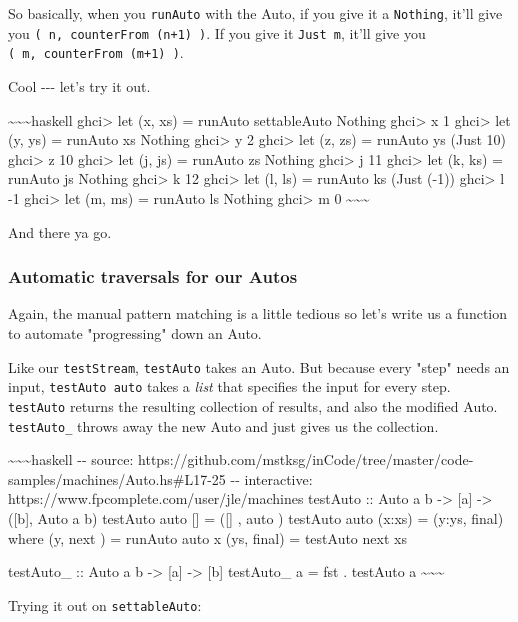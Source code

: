 \documentclass[]{article}
\begin{document}
So basically, when you \texttt{runAuto} with the Auto, if you give it a
\texttt{Nothing}, it'll give you \texttt{(\ n,\ counterFrom\ (n+1)\ )}. If you
give it \texttt{Just\ m}, it'll give you \texttt{(\ m,\ counterFrom\ (m+1)\ )}.

Cool -\/-\/- let's try it out.

\textasciitilde{}\textasciitilde{}\textasciitilde{}haskell ghci\textgreater{}
let (x, xs) = runAuto settableAuto Nothing ghci\textgreater{} x 1
ghci\textgreater{} let (y, ys) = runAuto xs Nothing ghci\textgreater{} y 2
ghci\textgreater{} let (z, zs) = runAuto ys (Just 10) ghci\textgreater{} z 10
ghci\textgreater{} let (j, js) = runAuto zs Nothing ghci\textgreater{} j 11
ghci\textgreater{} let (k, ks) = runAuto js Nothing ghci\textgreater{} k 12
ghci\textgreater{} let (l, ls) = runAuto ks (Just (-1)) ghci\textgreater{} l -1
ghci\textgreater{} let (m, ms) = runAuto ls Nothing ghci\textgreater{} m 0
\textasciitilde{}\textasciitilde{}\textasciitilde{}

And there ya go.

\subsubsection{Automatic traversals for our Autos}

Again, the manual pattern matching is a little tedious so let's write us a
function to automate "progressing" down an Auto.

Like our \texttt{testStream}, \texttt{testAuto} takes an Auto. But because every
"step" needs an input, \texttt{testAuto\ auto} takes a \emph{list} that
specifies the input for every step. \texttt{testAuto} returns the resulting
collection of results, and also the modified Auto. \texttt{testAuto\_} throws
away the new Auto and just gives us the collection.

\textasciitilde{}\textasciitilde{}\textasciitilde{}haskell -\/- source:
https://github.com/mstksg/inCode/tree/master/code-samples/machines/Auto.hs\#L17-25
-\/- interactive: https://www.fpcomplete.com/user/jle/machines testAuto :: Auto
a b -\textgreater{} {[}a{]} -\textgreater{} ({[}b{]}, Auto a b) testAuto auto
{[}{]} = ({[}{]} , auto ) testAuto auto (x:xs) = (y:ys, final) where (y, next )
= runAuto auto x (ys, final) = testAuto next xs

testAuto\_ :: Auto a b -\textgreater{} {[}a{]} -\textgreater{} {[}b{]}
testAuto\_ a = fst . testAuto a
\textasciitilde{}\textasciitilde{}\textasciitilde{}

Trying it out on \texttt{settableAuto}:
\end{document}
